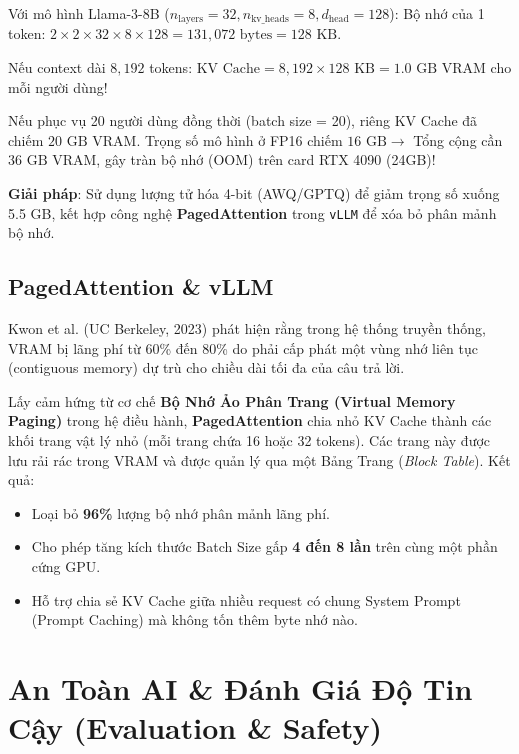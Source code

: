 \begin{guidelinebox}
Với mô hình Llama-3-8B ($n_{\text{layers}} = 32, n_{\text{kv\_heads}} = 8, d_{\text{head}} = 128$):
Bộ nhớ của 1 token: $2 \times 2 \times 32 \times 8 \times 128 = 131,072 \text{ bytes} = 128 \text{ KB}$.

Nếu context dài $8,192$ tokens:
$\text{KV Cache} = 8,192 \times 128 \text{ KB} = 1.0 \text{ GB}$ VRAM cho mỗi người dùng!

Nếu phục vụ 20 người dùng đồng thời (batch size = 20), riêng KV Cache đã chiếm $20 \text{ GB}$ VRAM. Trọng số mô hình ở FP16 chiếm $16 \text{ GB} \rightarrow$ Tổng cộng cần $36 \text{ GB}$ VRAM, gây tràn bộ nhớ (OOM) trên card RTX 4090 (24GB)!

\textbf{Giải pháp}: Sử dụng lượng tử hóa 4-bit (AWQ/GPTQ) để giảm trọng số xuống 5.5 GB, kết hợp công nghệ \textbf{PagedAttention} trong \texttt{vLLM} để xóa bỏ phân mảnh bộ nhớ.
\end{guidelinebox}

\subsection{PagedAttention \& vLLM}
Kwon et al. (UC Berkeley, 2023) phát hiện rằng trong hệ thống truyền thống, VRAM bị lãng phí từ 60\% đến 80\% do phải cấp phát một vùng nhớ liên tục (contiguous memory) dự trù cho chiều dài tối đa của câu trả lời.

Lấy cảm hứng từ cơ chế \textbf{Bộ Nhớ Ảo Phân Trang (Virtual Memory Paging)} trong hệ điều hành, \textbf{PagedAttention} chia nhỏ KV Cache thành các khối trang vật lý nhỏ (mỗi trang chứa 16 hoặc 32 tokens). Các trang này được lưu rải rác trong VRAM và được quản lý qua một Bảng Trang (\textit{Block Table}).
Kết quả:
\begin{itemize}
    \item Loại bỏ \textbf{96\%} lượng bộ nhớ phân mảnh lãng phí.
    \item Cho phép tăng kích thước Batch Size gấp \textbf{4 đến 8 lần} trên cùng một phần cứng GPU.
    \item Hỗ trợ chia sẻ KV Cache giữa nhiều request có chung System Prompt (Prompt Caching) mà không tốn thêm byte nhớ nào.
\end{itemize}

\section{An Toàn AI \& Đánh Giá Độ Tin Cậy (Evaluation \& Safety)}


